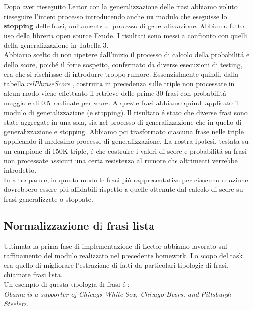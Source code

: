 \documentclass[twocolumn,10pt]{asme2ej}
\begin{document}
Dopo aver rieseguito Lector con la generalizzazione delle frasi abbiamo voluto rieseguire l'intero processo introducendo anche un modulo che eseguisse lo \textbf{stopping} delle frasi, unitamente al processo di generalizzazione. Abbiamo fatto uso della libreria open source Exude. I risultati sono messi a confronto con quelli della generalizzazione in Tabella 3. \\Abbiamo scelto di non ripetere dall'inizio il processo di calcolo della probabilit\'a e dello score, poich\'e il forte sospetto, confermato da diverse esecuzioni di testing, era che si rischiasse di introdurre troppo rumore. Essenzialmente quindi, dalla tabella \textit{relPhraseScore} , costruita in precedenza sulle triple non processate in alcun modo viene effettuato il retrieve delle prime 30 frasi con probabilit\'a maggiore di 0.5, ordinate per score. A queste frasi abbiamo quindi applicato il modulo di generalizzazione (e stopping). Il risultato \'e stato che diverse frasi sono state aggregate in una sola, sia nel processo di generalizzazione che in quello di generalizzazione e stopping. Abbiamo poi trasformato ciascuna frase nelle triple applicando il medesimo processo di generalizzazione. La nostra ipotesi, testata su un campione di 150K triple, \'e che costruire i valori di score e  probabilit\'a su frasi non processate assicuri una certa resistenza al rumore che altrimenti verrebbe introdotto. \\ In altre parole, in questo modo le frasi pi\'u rappresentative per ciascuna relazione dovrebbero essere pi\'u affidabili rispetto a quelle ottenute dal calcolo di score su frasi generalizzate o stoppate.
\subsection{Normalizzazione di frasi lista}
 
Ultimata la prima fase di implementazione di Lector abbiamo lavorato sul raffinamento del modulo realizzato nel precedente homework. Lo scopo del task era quello di migliorare l'estrazione di fatti da particolari tipologie di frasi, chiamate frasi lista.\\ Un esempio di questa tipologia di frasi \'e :\\

\textit{Obama is a supporter of Chicago White Sox, Chicago Bears, and Pittsburgh Steelers}.\\
\end{document}
